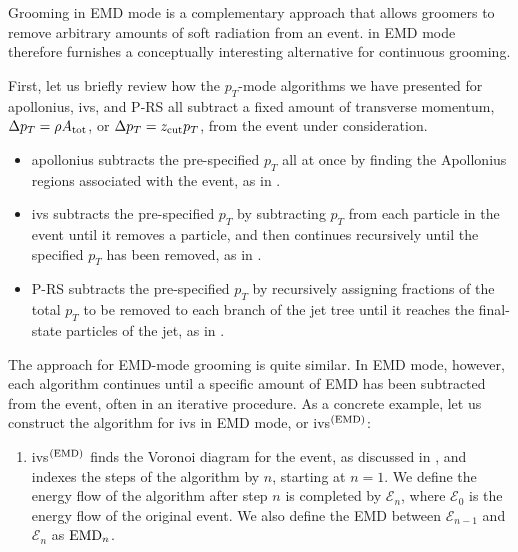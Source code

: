 \begin{subappendices}
Grooming in EMD mode is a complementary approach that allows \PIRANHA{} groomers to remove arbitrary amounts of soft radiation from an event.
%
\PIRANHA{} in EMD mode therefore furnishes a conceptually interesting alternative for continuous grooming.

First, let us briefly review how the \(p_T\)-mode algorithms we have presented for \gls{apollonius}, \gls{ivs}, and P-RS all subtract a fixed amount of transverse momentum, \(\Delta p_T = \rho A_{\rm tot}\), or \(\Delta p_T = z_{\rm cut} p_T\), from the event under consideration.
%
\begin{itemize}
\item
\gls{apollonius} subtracts the pre-specified \(p_T\) all at once by finding the Apollonius regions associated with the event, as in .
%
\item
\gls{ivs} subtracts the pre-specified \(p_T\) by subtracting \(p_T\) from each particle in the event until it removes a particle, and then continues recursively until the specified \(p_T\) has been removed, as in .
%
\item
P-RS subtracts the pre-specified \(p_T\) by recursively assigning fractions of the total \(p_T\) to be removed to each branch of the jet tree until it reaches the final-state particles of the jet, as in .
\end{itemize}


The approach for EMD-mode grooming is quite similar.
%
In EMD mode, however, each algorithm continues until a specific amount of EMD has been subtracted from the event, often in an iterative procedure.
%
As a concrete example, let us construct the algorithm for \gls{ivs} in EMD mode, or \gls{ivs}\(^{(\rm EMD)}\):
%
\begin{enumerate}
    \item
    \gls{ivs}\(^{(\rm EMD)}\) finds the Voronoi diagram for the event, as discussed in , and indexes the steps of the algorithm by \(n\), starting at \(n=1\).
    We define the energy flow of the algorithm after step \(n\) is completed by \(\mathcal{E}_n\), where \(\mathcal{E}_0\) is the energy flow of the original event.
    We also define the EMD between \(\mathcal{E}_{n-1}\) and \(\mathcal{E}_n\) as \({\rm EMD}_n\).


\end{enumerate}
\end{subappendices}

